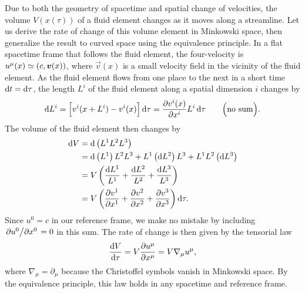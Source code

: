 Due to both the geometry of spacetime and spatial change of velocities, the volume $V(x(\tau))$ of a fluid element changes as it moves along a streamline.
Let us derive the rate of change of this volume element in Minkowski space, then generalize the result to curved space using the equivalence principle.
In a flat spacetime frame that follows the fluid element, the four-velocity is $u^\mu(x) \simeq (c, {\bm{v}}(x))$, where $\vec{v}(x)$ is a small velocity field in the vicinity of the fluid element.
As the fluid element flows from one place to the next in a short time $\mathop{}\!\mathrm{d} t = \mathop{}\!\mathrm{d} \tau$, the length $L^i$ of the fluid element along a spatial dimension $i$ changes by
\begin{equation}
	\mathop{}\!\mathrm{d} L^i = \Big[ v^i(x+L^i) - v^i(x) \Big] \mathop{}\!\mathrm{d} \tau 
	         = \pdv{v^i(x)}{x^i} L^i \mathop{}\!\mathrm{d} \tau
	\qquad \Big( \text{no sum} \Big) .
\end{equation}
The volume of the fluid element then changes by
\begin{equation}
\begin{split}
	\dif V &= \dif \left( L^1 L^2 L^3 \right) \\
	       &= \dif \left( L^1 \right) L^2 L^3 + L^1 \left( \dif L^2 \right) L^3 + L^1 L^2 \left( \dif L^3 \right) \\
	       &= V \left( \frac{\dif L^1}{L^1} + \frac{\dif L^2}{L^2} + \frac{\dif L^3}{L^3} \right) \\
	       &= V \left( \pdv{v^1}{x^1} + \pdv{v^2}{x^2} + \pdv{v^3}{x^3} \right) \dif \tau . \\
\end{split}
\end{equation}
Since $u^0 = c$ in our reference frame, we make no mistake by including $\pdv{u^0}/{x^0} = 0$ in this sum.
The rate of change is then given by the tensorial law
\begin{equation}
	\odv{V}{\tau} = V \pdv{u^\mu}{x^\mu} = V \nabla_\mu u^\mu ,
\label{eq:relfluid:volume_rate_change}
\end{equation}
where $\nabla_\mu = \partial_\mu$ because the Christoffel symbols vanish in Minkowski space.
By the equivalence principle, this law holds in any spacetime and reference frame.

